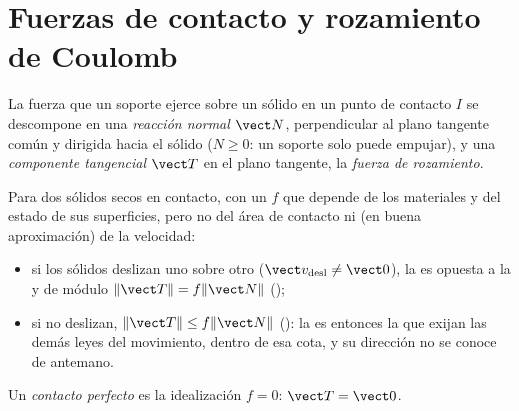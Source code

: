 \section{Fuerzas de contacto y rozamiento de Coulomb}

\begin{definition}\label{def:b2:rigid-body-mechanics:contact}
La fuerza que un soporte ejerce sobre un sólido en un punto de contacto
$I$ se descompone en una \emph{reacción normal} $\vect N$, perpendicular
al plano tangente común y dirigida hacia el sólido ($N \ge 0$: un soporte
solo puede empujar), y una \emph{componente tangencial} $\vect T$ en el
plano tangente, la \emph{fuerza de rozamiento}.
\end{definition}

\begin{theorem}\label{thm:b2:rigid-body-mechanics:coulomb}
Para dos sólidos secos en contacto, con un \emph{} $f$
que depende de los materiales y del estado de sus superficies, pero no del
área de contacto ni (en buena aproximación) de la velocidad:
\begin{itemize}
  \item si los sólidos deslizan uno sobre otro ($\vect v_{\text{desl}} \ne
        \vect 0$), la  es opuesta a la  y de módulo $\|\vect T\| = f\|\vect N\|$ ();
  \item si no deslizan, $\|\vect T\| \le f\|\vect N\|$ (): la  es entonces la que exijan las
        demás leyes del movimiento, dentro de esa cota, y su dirección no
        se conoce de antemano.
\end{itemize}
Un \emph{contacto perfecto} es la idealización $f = 0$: $\vect T = \vect 0$.
\end{theorem}
\admitted


